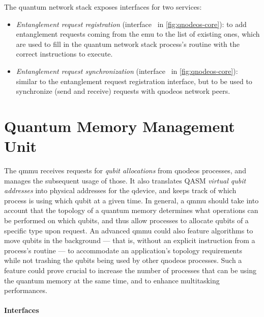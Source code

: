The quantum network stack exposes interfaces for two services:
\begin{itemize}
    \item \emph{Entanglement request registration} (interface~ in
          \cref{fig:qnodeos-core}): to add entanglement requests coming from the \acrshort{emu} to
          the list of existing ones, which are used to fill in the quantum network stack process's
          routine with the correct instructions to execute.
    \item \emph{Entanglement request synchronization} (interface~ in
          \cref{fig:qnodeos-core}): similar to the entanglement request registration interface, but
          to be used to synchronize (send and receive) requests with \acrshort{qnodeos} network
          peers.
\end{itemize}

\section{Quantum Memory Management Unit}

The \acrfull{qmmu} receives requests for \emph{qubit allocations} from \acrshort{qnodeos} processes,
and manages the subsequent usage of those. It also translates QASM \emph{virtual qubit addresses}
into physical addresses for the \acrshort{qdevice}, and keeps track of which process is using which
qubit at a given time. In general, a \acrshort{qmmu} should take into account that the topology of a
quantum memory determines what operations can be performed on which qubits, and thus allow processes
to allocate qubits of a specific type upon request. An advanced \acrshort{qmmu} could also feature
algorithms to move qubits in the background --- that is, without an explicit instruction from a
process's routine --- to accommodate an application's topology requirements while not trashing the
qubits being used by other \acrshort{qnodeos} processes. Such a feature could prove crucial to
increase the number of processes that can be using the quantum memory at the same time, and to
enhance multitasking performances.

\paragraph{Interfaces}

